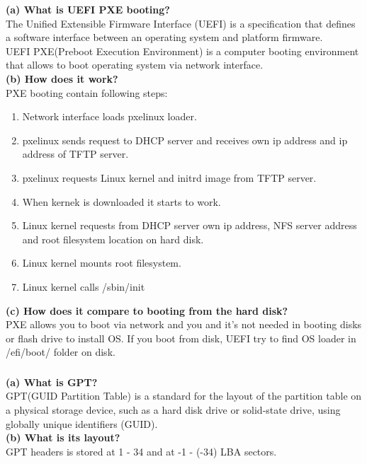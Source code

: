 \documentclass[a4paper,11pt]{article}
\theoremstyle{mytheor}
\begin{document}
\textbf{(a) What is UEFI PXE booting?}\\
The Unified Extensible Firmware Interface (UEFI) is a specification that defines a software interface between an operating system and platform firmware.\\UEFI PXE(Preboot Execution Environment) is a computer booting environment that allows to boot operating system via network interface.\\
\textbf{(b) How does it work?}\\
PXE booting contain following steps:
\begin{enumerate}
    \item Network interface loads pxelinux loader.
    \item pxelinux sends request to DHCP server and receives own ip address and ip address of TFTP server.
    \item pxelinux requests Linux kernel and initrd image from TFTP server.
    \item When kernek is downloaded it starts to work.
    \item Linux kernel requests from DHCP server own ip address, NFS server address and root filesystem location on hard disk.
    \item Linux kernel mounts root filesystem.
    \item Linux kernel calls /sbin/init

\end{enumerate}
\textbf{(c) How does it compare to booting from the hard disk?}\\
PXE allows you to boot via network and you and it's not needed in booting disks or flash drive to install OS. If you boot from disk, UEFI try to find OS loader in /efi/boot/ folder on disk.

\subsubsection{}
\textbf{(a) What is GPT?}\\
GPT(GUID Partition Table) is a standard for the layout of the partition table on a physical storage device, such as a hard disk drive or solid-state drive, using globally unique identifiers (GUID).\\
\textbf{(b) What is its layout?}\\
GPT headers is stored at 1 - 34 and at -1 - (-34) LBA sectors.\\
\end{document}
